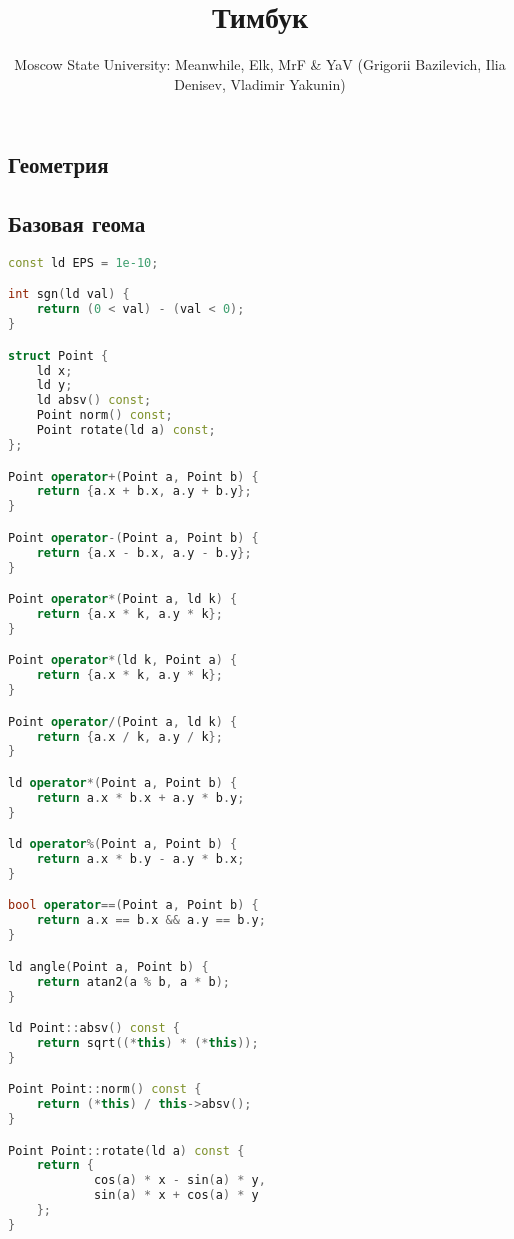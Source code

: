 \documentclass[10pt,a4paper,landscape,twosided]{extarticle}
\begin{document}
\title{Тимбук}
\author{Moscow State University: Meanwhile, Elk, MrF \& YaV (Grigorii Bazilevich, Ilia Denisev, Vladimir Yakunin)}
\maketitle
\begin{multicols}{3}

\tableofcontents
{}


\section{Геометрия}

\subsection{Базовая геома}
\begin{lstlisting}[language=C++]
const ld EPS = 1e-10;

int sgn(ld val) {
    return (0 < val) - (val < 0);
}

struct Point {
    ld x;
    ld y;
    ld absv() const;
    Point norm() const;
    Point rotate(ld a) const;
};

Point operator+(Point a, Point b) {
    return {a.x + b.x, a.y + b.y};
}

Point operator-(Point a, Point b) {
    return {a.x - b.x, a.y - b.y};
}

Point operator*(Point a, ld k) {
    return {a.x * k, a.y * k};
}

Point operator*(ld k, Point a) {
    return {a.x * k, a.y * k};
}

Point operator/(Point a, ld k) {
    return {a.x / k, a.y / k};
}

ld operator*(Point a, Point b) {
    return a.x * b.x + a.y * b.y;
}

ld operator%(Point a, Point b) {
    return a.x * b.y - a.y * b.x;
}

bool operator==(Point a, Point b) {
    return a.x == b.x && a.y == b.y;
}

ld angle(Point a, Point b) {
    return atan2(a % b, a * b);
}

ld Point::absv() const {
    return sqrt((*this) * (*this));
}

Point Point::norm() const {
    return (*this) / this->absv();
}

Point Point::rotate(ld a) const {
    return {
            cos(a) * x - sin(a) * y,
            sin(a) * x + cos(a) * y
    };
}


\end{lstlisting}
\end{multicols}
\end{document}
